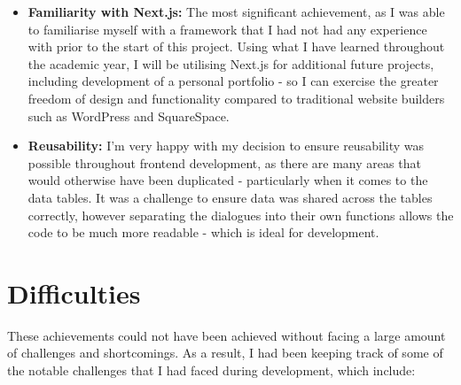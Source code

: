\documentclass[]{final_report}
\begin{document}
\begin{itemize}
	\item \textbf{Familiarity with Next.js:} The most significant achievement, as I was able to familiarise myself with a framework that I had not had any experience with prior to the start of this project. Using what I have learned throughout the academic year, I will be utilising Next.js for additional future projects, including development of a personal portfolio - so I can exercise the greater freedom of design and functionality compared to traditional website builders such as WordPress and SquareSpace.
	\item \textbf{Reusability:} I'm very happy with my decision to ensure reusability was possible throughout frontend development, as there are many areas that would otherwise have been duplicated - particularly when it comes to the data tables. It was a challenge to ensure data was shared across the tables correctly, however separating the dialogues into their own functions allows the code to be much more readable - which is ideal for development.
\end{itemize}

\section{Difficulties}

These achievements could not have been achieved without facing a large amount of challenges and shortcomings. As a result, I had been keeping track of some of the notable challenges that I had faced during development, which include:
\end{document}

